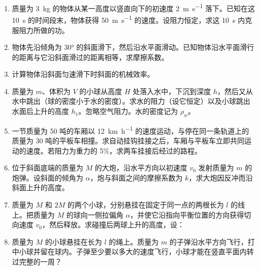 \begin{enumerate}[resume*=problems]
\item 质量为 \SI{3}{\kilogram} 的物体从某一高度以竖直向下的初速度 \SI{2}{\meter\per\second} 落下。已知在这 \SI{10}{\second} 的时间段末，物体获得 \SI{50}{\meter\per\second} 的速度。设阻力恒定，求这 \SI{10}{\second} 内克服阻力所做的功。

\item 物体先沿倾角为 \ang{30} 的斜面滑下，然后沿水平面滑动。已知物体沿水平面滑行的距离与它沿斜面滑过的距离相等，求摩擦系数。

\item 计算物体沿斜面匀速滑下时斜面的机械效率。

\item 质量为 $m$、体积为 $V$ 的小球从高度 $H$ 处落入水中，下沉到深度 $h$，然后又从水中跳出（球的密度小于水的密度）。求水的阻力（设它恒定）以及小球跳出水面后上升的高度 $h_{1}$。忽略空气阻力。水的密度记为 $\rho_{w}$。

\item 一节质量为 50 吨的车厢以 \SI{12}{\kilo\meter\per\hour} 的速度运动，与停在同一条轨道上的质量为 30 吨的平板车相撞。求自动挂钩挂接之后，车厢与平板车立即共同运动的速度。若阻力为重力的 5\%，求两车挂接后经过的路程。

\item 位于斜面底端的质量为 $M$ 的大炮，沿水平方向以初速度 $v_{0}$ 发射质量为 $m$ 的炮弹。设斜面的倾角为 $\alpha$，炮与斜面之间的摩擦系数为 $k$，求大炮因反冲而沿斜面上升的高度。

\item 质量为 $M$ 和 $2M$ 的两个小球，分别悬挂在固定于同一点的两根长为 $l$ 的线上。把质量为 $M$ 的球向一侧拉偏角 $\alpha$，并使它沿指向平衡位置的方向获得切向速度 $v_{0}$，然后释放。求碰撞后两球上升的高度，设：
\item 质量为 $M$ 的小球悬挂在长为 $l$ 的绳上。质量为 $m$ 的子弹沿水平方向飞行，打中小球并留在球内。子弹至少要以多大的速度飞行，小球才能在竖直平面内转过完整的一周？


\end{enumerate}
